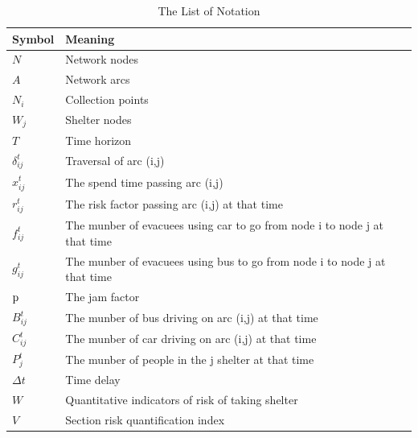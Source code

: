 \documentclass{mcmthesis}
\begin{document}
\begin{center}
  \begin{longtable}{p{}p{}m{}}
    \caption{The List of Notation}                                                               \\
    \hline
    Symbol           & Meaning                                                                   \\
    \hline

    $N$              & Network nodes
    \\
    $A$              & Network arcs
    \\
    $N_i$            & Collection points
    \\
    $W_j$            & Shelter nodes                                                             \\
    $T$              & Time horizon                                                              \\
    $\delta _{ij}^t$ & Traversal of arc (i,j)                                                    \\
    $x_{ij}^t$       & The spend time passing arc (i,j)                                          \\
    $r_{ij}^t$       & The risk factor passing arc (i,j) at that time                            \\
    $f_{ij}^t$       & The munber of evacuees using car to go from node i to node j at that time \\
    $g_{ij}^t$       & The munber of evacuees using bus to go from node i to node j at that time \\
    $\rm{p}$         & The jam factor                                                            \\
    $B_{ij}^t$       & The munber of bus driving on arc (i,j) at that time                       \\
    $C_{ij}^t$       & The munber of car driving on arc (i,j) at that time                       \\
    $P_j^t$          & The munber of people in the j shelter at that time                        \\
    $\Delta t$       & Time delay                                                                \\
    $W$              & Quantitative indicators of risk of taking shelter                         \\
    $V$              & Section risk quantification index                                         \\

\end{longtable}
\end{center}
\end{document}

